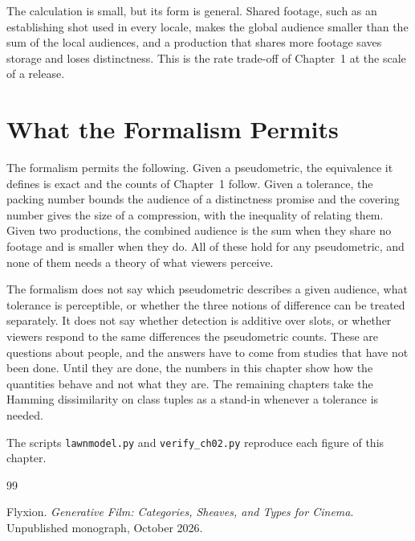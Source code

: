\documentclass[11pt,twoside,openright]{book}
\theoremstyle{plain}
\theoremstyle{definition}
\theoremstyle{remark}
\begin{document}
The calculation is small, but its form is general. Shared footage, such as an establishing shot used in every locale, makes the global audience smaller than the sum of the local audiences, and a production that shares more footage saves storage and loses distinctness. This is the rate trade-off of Chapter~1 at the scale of a release.

\section{What the Formalism Permits}\label{sec:permits}

The formalism permits the following. Given a pseudometric, the equivalence it defines is exact and the counts of Chapter~1 follow. Given a tolerance, the packing number bounds the audience of a distinctness promise and the covering number gives the size of a compression, with the inequality of  relating them. Given two productions, the combined audience is the sum when they share no footage and is smaller when they do. All of these hold for any pseudometric, and none of them needs a theory of what viewers perceive.

The formalism does not say which pseudometric describes a given audience, what tolerance is perceptible, or whether the three notions of difference can be treated separately. It does not say whether detection is additive over slots, or whether viewers respond to the same differences the pseudometric counts. These are questions about people, and the answers have to come from studies that have not been done. Until they are done, the numbers in this chapter show how the quantities behave and not what they are. The remaining chapters take the Hamming dissimilarity on class tuples as a stand-in whenever a tolerance is needed.

The scripts \texttt{lawnmodel.py} and \texttt{verify\_ch02.py} reproduce each figure of this chapter.

\begin{thebibliography}{99}

Flyxion.
\newblock \emph{Generative Film: Categories, Sheaves, and Types for Cinema}.
\newblock Unpublished monograph, October 2026.

\end{thebibliography}
\end{document}

